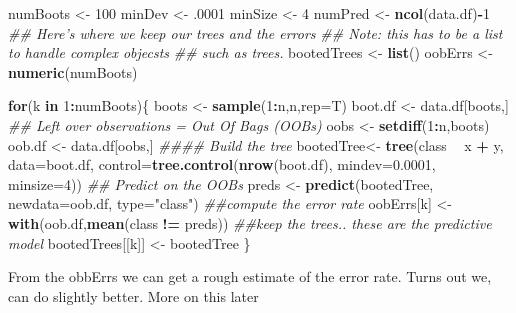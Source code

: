 \documentclass[]{article}
\newenvironment{Shaded}{\begin{snugshade}}{\end{snugshade}}
\newcommand{\CommentTok}[1]{\textcolor[rgb]{0.56,0.35,0.01}{\textit{#1}}}
\newcommand{\ControlFlowTok}[1]{\textcolor[rgb]{0.13,0.29,0.53}{\textbf{#1}}}
\newcommand{\DataTypeTok}[1]{\textcolor[rgb]{0.13,0.29,0.53}{#1}}
\newcommand{\DecValTok}[1]{\textcolor[rgb]{0.00,0.00,0.81}{#1}}
\newcommand{\FloatTok}[1]{\textcolor[rgb]{0.00,0.00,0.81}{#1}}
\newcommand{\KeywordTok}[1]{\textcolor[rgb]{0.13,0.29,0.53}{\textbf{#1}}}
\newcommand{\NormalTok}[1]{#1}
\newcommand{\OperatorTok}[1]{\textcolor[rgb]{0.81,0.36,0.00}{\textbf{#1}}}
\newcommand{\StringTok}[1]{\textcolor[rgb]{0.31,0.60,0.02}{#1}}
\begin{document}
\begin{Shaded}
\begin{Highlighting}[]
\NormalTok{numBoots <-}\StringTok{ }\DecValTok{100}
\NormalTok{minDev <-}\StringTok{ }\FloatTok{.0001}
\NormalTok{minSize <-}\StringTok{ }\DecValTok{4}
\NormalTok{numPred <-}\StringTok{ }\KeywordTok{ncol}\NormalTok{(data.df)}\OperatorTok{-}\DecValTok{1}
\CommentTok{## Here's where we keep our trees and the errors}
\CommentTok{## Note: this has to be a list to handle complex objecsts}
\CommentTok{## such as trees.}
\NormalTok{bootedTrees <-}\StringTok{ }\KeywordTok{list}\NormalTok{()}
\NormalTok{oobErrs <-}\StringTok{ }\KeywordTok{numeric}\NormalTok{(numBoots)}

\ControlFlowTok{for}\NormalTok{(k }\ControlFlowTok{in} \DecValTok{1}\OperatorTok{:}\NormalTok{numBoots)\{}
\NormalTok{  boots <-}\StringTok{ }\KeywordTok{sample}\NormalTok{(}\DecValTok{1}\OperatorTok{:}\NormalTok{n,n,}\DataTypeTok{rep=}\NormalTok{T)}
\NormalTok{  boot.df <-}\StringTok{ }\NormalTok{data.df[boots,]}
  \CommentTok{## Left over observations =  Out Of Bags (OOBs) }
\NormalTok{  oobs <-}\StringTok{ }\KeywordTok{setdiff}\NormalTok{(}\DecValTok{1}\OperatorTok{:}\NormalTok{n,boots)}
\NormalTok{  oob.df <-}\StringTok{ }\NormalTok{data.df[oobs,]}
  \CommentTok{#### Build the tree}
\NormalTok{  bootedTree<-}\StringTok{ }\KeywordTok{tree}\NormalTok{(class }\OperatorTok{~}\StringTok{ }\NormalTok{x }\OperatorTok{+}\StringTok{ }\NormalTok{y, }
                    \DataTypeTok{data=}\NormalTok{boot.df,}
                    \DataTypeTok{control=}\KeywordTok{tree.control}\NormalTok{(}\KeywordTok{nrow}\NormalTok{(boot.df),}
                                         \DataTypeTok{mindev=}\FloatTok{0.0001}\NormalTok{,}
                                         \DataTypeTok{minsize=}\DecValTok{4}\NormalTok{))}
  \CommentTok{## Predict on the OOBs}
\NormalTok{  preds <-}\StringTok{ }\KeywordTok{predict}\NormalTok{(bootedTree,}
                   \DataTypeTok{newdata=}\NormalTok{oob.df,}
                   \DataTypeTok{type=}\StringTok{"class"}\NormalTok{)}
  \CommentTok{##compute the error rate}
\NormalTok{  oobErrs[k] <-}\StringTok{ }\KeywordTok{with}\NormalTok{(oob.df,}\KeywordTok{mean}\NormalTok{(class }\OperatorTok{!=}\StringTok{ }\NormalTok{preds))}
  \CommentTok{##keep the trees.. these are the predictive model}
\NormalTok{  bootedTrees[[k]] <-}\StringTok{ }\NormalTok{bootedTree}
\NormalTok{\}}
\end{Highlighting}
\end{Shaded}

From the obbErrs we can get a rough estimate of the error rate. Turns
out we, can do slightly better. More on this later
\end{document}
